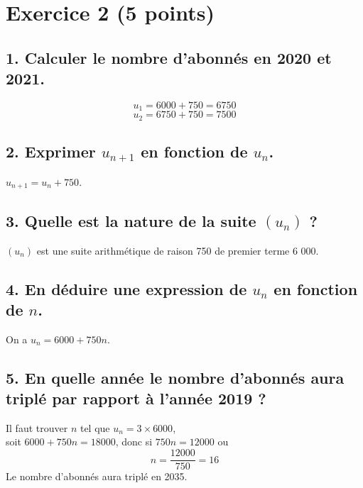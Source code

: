 \section*{Exercice 2 (5 points)}


\subsection*{1. Calculer le nombre d’abonnés en 2020 et 2021.}
	
\[	u_1 = 6000 + 750 = 6750\]
\[	u_2 = 6750 + 750 = 7500\]
	
	\subsection*{2. Exprimer $u_{n+1}$ en fonction de $u_n$.}
$u_{n+1} = u_n + 750$.
\subsection*{3. Quelle est la nature de la suite $(u_n)$ ?}
$(u_n)$ est une suite arithmétique de raison 750 de premier terme 6 000.
\subsection*{4. En déduire une expression de $u_n$ en fonction de $n$.}
On a $u_n = 6000 + 750n$.
\subsection*{5. En quelle année le nombre d’abonnés aura triplé par rapport à l’année 2019 ?}
Il faut trouver $n$ tel que $u_n = 3 \times 6000$,\\ soit $6000 + 750n = 18000$, donc si $750n = 12000$ ou
	\[
	n = \dfrac{12000}{750} = 16
	\]
Le nombre d’abonnés aura triplé en 2035.

